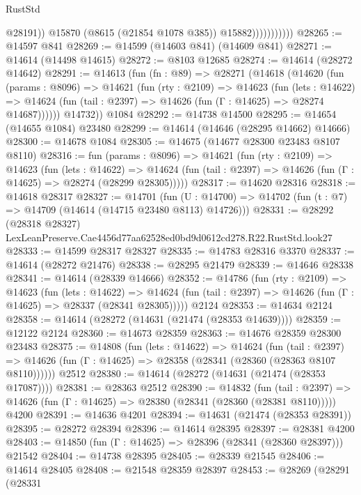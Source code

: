 \begin{lexlean}{RustStd}
\begin{coremodule}
                              @28191))
                          @15870
                          (@8615 (@21854 @1078 @385))
                          @15882)))))))))))
@28265 := @14597 @841
@28269 := @14599 (@14603 @841) (@14609 @841)
@28271 := @14614 (@14498 @14615)
@28272 := @8103 @12685
@28274 := @14614 (@28272 @14642)
@28291 := @14613
    (fun (fn : @89) =>
    @28271
      (@14618
        (@14620
          (fun (params : @8096) =>
          @14621
            (fun (rty : @2109) =>
            @14623
              (fun (lets : @14622) =>
              @14624 (fun (tail : @2397) => @14626 (fun (Γ : @14625) => @28274 @14687))))))
        @14732))
    @1084
@28292 := @14738 @14500
@28295 := @14654 (@14655 @1084) @23480
@28299 := @14614 (@14646 (@28295 @14662) @14666)
@28300 := @14678 @1084
@28305 := @14675 (@14677 @28300 @23483 @8107 @8110)
@28316 := fun (params : @8096) =>
  @14621
    (fun (rty : @2109) =>
    @14623
      (fun (lets : @14622) =>
      @14624 (fun (tail : @2397) => @14626 (fun (Γ : @14625) => @28274 (@28299 @28305)))))
@28317 := @14620 @28316
@28318 := @14618 @28317
@28327 := @14701
    (fun (U : @14700) => @14702 (fun (t : @7) => @14709 (@14614 (@14715 @23480 @8113) @14726)))
@28331 := @28292
    (@28318 @28327)
    LexLeanPreserve.Cae4456d77aa62528ed0bd9d0612cd278.R22.RustStd.look27
@28333 := @14599 @28317 @28327
@28335 := @14783 @28316 @3370
@28337 := @14614 (@28272 @21476)
@28338 := @28295 @21479
@28339 := @14646 @28338
@28341 := @14614 (@28339 @14666)
@28352 := @14786
    (fun (rty : @2109) =>
    @14623
      (fun (lets : @14622) =>
      @14624 (fun (tail : @2397) => @14626 (fun (Γ : @14625) => @28337 (@28341 @28305)))))
    @2124
@28353 := @14634 @2124
@28358 := @14614 (@28272 (@14631 (@21474 (@28353 @14639))))
@28359 := @12122 @2124
@28360 := @14673 @28359
@28363 := @14676 @28359 @28300 @23483
@28375 := @14808
    (fun (lets : @14622) =>
    @14624
      (fun (tail : @2397) =>
      @14626 (fun (Γ : @14625) => @28358 (@28341 (@28360 (@28363 @8107 @8110))))))
    @2512
@28380 := @14614 (@28272 (@14631 (@21474 (@28353 @17087))))
@28381 := @28363 @2512
@28390 := @14832
    (fun (tail : @2397) => @14626 (fun (Γ : @14625) => @28380 (@28341 (@28360 (@28381 @8110)))))
    @4200
@28391 := @14636 @4201
@28394 := @14631 (@21474 (@28353 @28391))
@28395 := @28272 @28394
@28396 := @14614 @28395
@28397 := @28381 @4200
@28403 := @14850 (fun (Γ : @14625) => @28396 (@28341 (@28360 @28397))) @21542
@28404 := @14738 @28395
@28405 := @28339 @21545
@28406 := @14614 @28405
@28408 := @21548 @28359 @28397
@28453 := @28269
    (@28291
      (@28331

\end{coremodule}
\end{lexlean}
